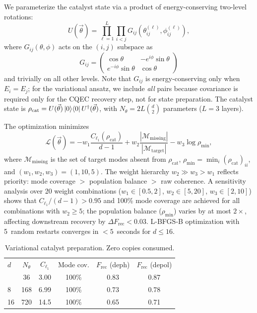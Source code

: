 \documentclass[pra,twocolumn,superscriptaddress,longbibliography,floatfix]{revtex4-2}
\begin{document}
We parameterize the catalyst state via a product of energy-conserving two-level rotations:
\begin{equation}
U(\vec\theta) = \prod_{\ell=1}^{L} \prod_{i < j} G_{ij}(\theta_{ij}^{(\ell)}, \phi_{ij}^{(\ell)}),
\label{eq:ansatz}
\end{equation}
where $G_{ij}(\theta, \phi)$ acts on the $(i, j)$ subspace as
\begin{equation}
G_{ij} = \begin{pmatrix} \cos\theta & -e^{i\phi}\sin\theta \\ e^{-i\phi}\sin\theta & \cos\theta \end{pmatrix}
\label{eq:ec_rotation}
\end{equation}
and trivially on all other levels.
Note that $G_{ij}$ is energy-conserving only when $E_i = E_j$; for the variational ansatz, we include \emph{all} pairs because covariance is required only for the CQEC recovery step, not for state preparation.
The catalyst state is $\rho_\mathrm{cat} = U(\vec\theta)\ket{0}\!\bra{0}U^\dagger(\vec\theta)$, with $N_\theta = 2L\binom{d}{2}$ parameters ($L = 3$ layers).

The optimization minimizes
\begin{equation}
\mathcal{L}(\vec\theta) = -w_1 \frac{C_{\ell_1}(\rho_\mathrm{cat})}{d-1} + w_2 \frac{|\mathcal{M}_\mathrm{missing}|}{|\mathcal{M}_\mathrm{target}|} - w_3 \log \rho_\mathrm{min},
\label{eq:var_cost}
\end{equation}
where $\mathcal{M}_\mathrm{missing}$ is the set of target modes absent from $\rho_\mathrm{cat}$, $\rho_\mathrm{min} = \min_i (\rho_\mathrm{cat})_{ii}$, and $(w_1, w_2, w_3) = (1, 10, 5)$.
The weight hierarchy $w_2 \gg w_3 > w_1$ reflects priority: mode coverage $>$ population balance $>$ raw coherence.
A sensitivity analysis over 20 weight combinations ($w_1 \in [0.5, 2]$, $w_2 \in [5, 20]$, $w_3 \in [2, 10]$) shows that $C_{\ell_1}/(d-1) > 0.95$ and 100\% mode coverage are achieved for all combinations with $w_2 \geq 5$; the population balance ($\rho_\mathrm{min}$) varies by at most $2\times$, affecting downstream recovery by $\Delta F_\mathrm{rec} < 0.03$.
L-BFGS-B optimization with 5~random restarts converges in $<5$~seconds for $d \leq 16$.

\begin{table}[tb]
\caption{Variational catalyst preparation. Zero copies consumed.}
\label{tab:variational}
\centering\footnotesize
\setlength{\tabcolsep}{3pt}
\begin{ruledtabular}
\begin{tabular}{lccccc}
$d$ & $N_\theta$ & $C_{\ell_1}$ & Mode cov. & $F_\mathrm{rec}$ (deph) & $F_\mathrm{rec}$ (depol) \\
\colrule
4 & 36 & 3.00 & 100\% & 0.83 & 0.87 \\
8 & 168 & 6.99 & 100\% & 0.73 & 0.78 \\
16 & 720 & 14.5 & 100\% & 0.65 & 0.71 \\
\end{tabular}
\end{ruledtabular}
\end{table}
\end{document}
